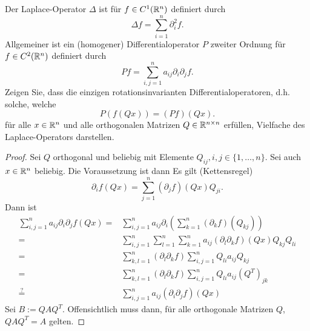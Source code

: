 \begin{Problem}
	Der Laplace-Operator $\Delta$ ist f\"{u}r $f\in C^1(\mathbb{R}^n)$ definiert durch
	\[
		\Delta f=\sum_{i=1}^n \partial_i^2 f
	.\] 
	Allgemeiner ist ein (homogener) Differentialoperator $P$ zweiter Ordnung f\"{u}r $f\in C^2(\mathbb{R}^n)$ definiert durch
	\[
		Pf=\sum_{i,j=1}^n a_{ij}\partial_i\partial_j f
	.\] 
	Zeigen Sie, dass die einzigen rotationsinvarianten Differentialoperatoren, d.h. solche, welche
	\[
		P(f(Qx))=(Pf)(Qx)
	.\] 
	f\"{u}r alle $x\in \mathbb{R}^n$ und alle orthogonalen Matrizen $Q\in \mathbb{R}^{n\times n}$ erfüllen, Vielfache des Laplace-Operators darstellen.
\end{Problem}
\begin{proof}
	Sei $Q$ orthogonal und beliebig mit Elemente $Q_{ij},i,j\in \{1,\dots, n\} $. Sei auch $x\in \mathbb{R}^n$ beliebig. Die Voraussetzung ist dann
	Es gilt (Kettensregel)
	\[
		\partial_i f(Qx)=\sum_{j=1}^n(\partial_j f)(Qx)Q_{ji}
	.\]
	Dann ist 
	\begin{align*}
		\sum_{i,j=1}^n a_{ij}\partial_i \partial_j f(Qx)=&	\sum_{i,j=1}^n a_{ij}\partial_i \left( \sum_{k=1}^n (\partial_k f)(Q_{kj}) \right) \\
		=&\sum_{i,j=1}^n \sum_{l=1}^n\sum_{k=1}^n a_{ij}(\partial_l \partial_k f)(Qx)Q_{kj}Q_{li}\\
		=&\sum_{k,l=1}^n (\partial_l\partial_k f)\sum_{i,j=1}^n Q_{li}a_{ij}Q_{kj}\\
		=&\sum_{k,l=1}^n (\partial_l\partial_k f)\sum_{i,j=1}^n Q_{li}a_{ij}(Q^T)_{jk}\\
		\overset{?}{=}&\sum_{i,j=1}^n a_{ij}(\partial_i\partial_j f)(Qx)
	\end{align*}
	Sei $B:=QAQ^T$. Offensichtlich muss dann, f\"{u}r alle orthogonale Matrizen $Q$, $QAQ^T=A$ gelten.
\end{proof}

